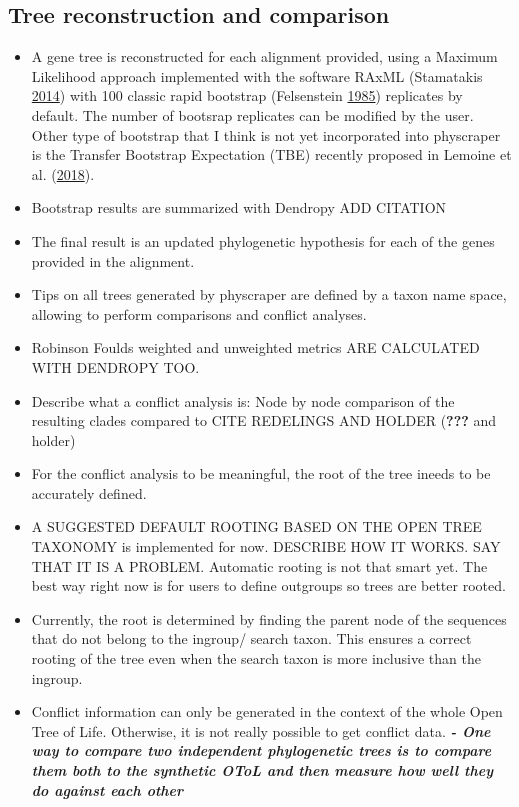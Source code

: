 \documentclass[]{article}
\providecommand{\tightlist}{%
  \setlength{\itemsep}{0pt}\setlength{\parskip}{0pt}}
\begin{document}
\hypertarget{tree-reconstruction-and-comparison}{%
\subsection{Tree reconstruction and comparison}\label{tree-reconstruction-and-comparison}}

\begin{itemize}
\tightlist
\item
  A gene tree is reconstructed for each alignment provided, using a Maximum Likelihood approach implemented with the software RAxML (Stamatakis \protect\hyperlink{ref-stamatakis2014raxml}{2014})
  with 100 classic rapid bootstrap (Felsenstein \protect\hyperlink{ref-felsenstein1985confidence}{1985}) replicates by default. The number of bootsrap replicates can be modified by the user.
  Other type of bootstrap that I think is not yet incorporated into physcraper is the Transfer Bootstrap Expectation (TBE) recently proposed in Lemoine et al. (\protect\hyperlink{ref-lemoine2018renewing}{2018}).
\item
  Bootstrap results are summarized with Dendropy ADD CITATION
\item
  The final result is an updated phylogenetic hypothesis for each of the genes provided in the alignment.
\item
  Tips on all trees generated by physcraper are defined by a taxon name space, allowing to perform comparisons and conflict analyses.
\item
  Robinson Foulds weighted and unweighted metrics ARE CALCULATED WITH DENDROPY TOO.
\item
  Describe what a conflict analysis is: Node by node comparison of the resulting clades compared to CITE REDELINGS AND HOLDER ({\textbf{???}} and holder)
\item
  For the conflict analysis to be meaningful, the root of the tree ineeds to be accurately defined.
\item
  A SUGGESTED DEFAULT ROOTING BASED ON THE OPEN TREE TAXONOMY is implemented for now. DESCRIBE HOW IT WORKS. SAY THAT IT IS A PROBLEM. Automatic rooting is not that smart yet. The best way right now is for users to define outgroups so trees are better rooted.
\item
  Currently, the root is determined by finding the parent node of the sequences that do not belong to the ingroup/ search taxon. This ensures a correct rooting of the tree even when the search taxon is more inclusive than the ingroup.
\item
  Conflict information can only be generated in the context of the whole Open Tree of
  Life. Otherwise, it is not really possible to get conflict data.
  \textbf{\emph{- One way to compare two independent phylogenetic trees is to compare them both to
  the synthetic OToL and then measure how well they do against each other}}
\end{itemize}
\end{document}

